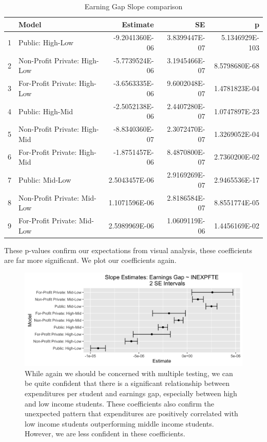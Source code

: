 \documentclass{article}
\begin{document}
\begin{table}[ht]
\centering
\caption{Earning Gap Slope comparison} 
\begin{tabular}{rlrrr}
  \hline
 & Model & Estimate & SE & p \\ 
  \hline
1 & Public: High-Low & -9.2041360E-06 & 3.8399447E-07 & 5.1346929E-103 \\ 
  2 & Non-Profit Private: High-Low & -5.7739524E-06 & 3.1945466E-07 & 8.5798680E-68 \\ 
  3 & For-Profit Private: High-Low & -3.6563335E-06 & 9.6002048E-07 & 1.4781823E-04 \\ 
  4 & Public: High-Mid & -2.5052138E-06 & 2.4407280E-07 & 1.0747897E-23 \\ 
  5 & Non-Profit Private: High-Mid & -8.8340360E-07 & 2.3072470E-07 & 1.3269052E-04 \\ 
  6 & For-Profit Private: High-Mid & -1.8751457E-06 & 8.4870800E-07 & 2.7360200E-02 \\ 
  7 & Public: Mid-Low & 2.5043457E-06 & 2.9169269E-07 & 2.9465536E-17 \\ 
  8 & Non-Profit Private: Mid-Low & 1.1071596E-06 & 2.8186584E-07 & 8.8551774E-05 \\ 
  9 & For-Profit Private: Mid-Low & 2.5989969E-06 & 1.0609119E-06 & 1.4456169E-02 \\ 
   \hline
\end{tabular}
\end{table}
These p-values confirm our expectations from visual analysis, these coefficients are far more significant. We plot our coefficients again.

\begin{figure}[H]
\centering
\includegraphics[width=1\textwidth]{../images/earnings_gaps_results.png}
\caption{\label{fig: earnings_gaps_table} While again we should be concerned with multiple testing, we can be quite confident that there is a significant relationship between expenditures per student and earnings gap, especially between high and low income students. These coefficients also confirm the unexpected pattern that expenditures are positively correlated with low income students outperforming middle income students. However, we are less confident in these coefficients.}
\end{figure}
\end{document}
